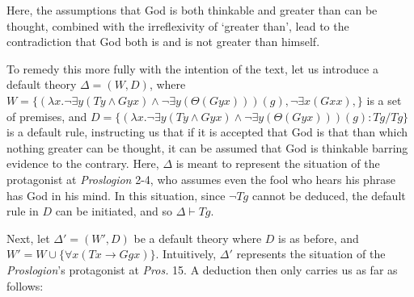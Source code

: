 \documentclass[]{amsart}
\begin{document}
Here, the assumptions that God is both thinkable and greater than can be thought, combined with the irreflexivity of `greater than', lead to the contradiction that God both is and is not greater than himself.

To remedy this more fully with the intention of the text, let us introduce a default theory $\Delta = (W, D)$, where $W = \{(\lambda x. \neg \exists y (Ty \wedge Gyx) \wedge \neg\exists y(\Theta(Gyx)))(g), \neg \exists x (Gxx),\}$ is a set of premises, and $D = \{(\lambda x. \neg \exists y (Ty \wedge Gyx) \wedge \neg\exists y(\Theta(Gyx)))(g) : Tg/Tg\}$ is a default rule, instructing us that if it is accepted that God is that than which nothing greater can be thought, it can be assumed that God is thinkable barring evidence to the contrary. Here, $\Delta$ is meant to represent the situation of the protagonist at \textit{Proslogion} 2-4, who assumes even the fool who hears his phrase has God in his mind. In this situation, since $\neg Tg$ cannot be deduced, the default rule in $D$ can be initiated, and so $\Delta \vdash Tg$.

Next, let $\Delta' =(W', D)$ be a default theory where $D$ is as before, and $W' = W \cup \{\forall x (Tx \rightarrow Ggx)\}$. Intuitively, $\Delta'$ represents the situation of the \textit{Proslogion}'s protagonist at \textit{Pros.} 15. A deduction then only carries us as far as follows:

\bigskip


\bigskip
\end{document}
